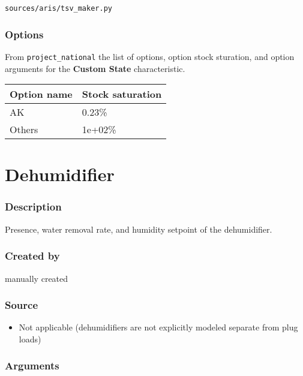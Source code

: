 \texttt{sources/aris/tsv\_maker.py}

\subsubsection{Options}\label{options-30}

From \texttt{project\_national} the list of options, option stock
sturation, and option arguments for the \textbf{Custom State}
characteristic.

\begin{longtable}[]{@{}ll@{}}
\toprule\noalign{}
Option name & Stock saturation \\
\midrule\noalign{}
\endhead
\bottomrule\noalign{}
\endlastfoot
AK & 0.23\% \\
Others & 1e+02\% \\
\end{longtable}

\section{Dehumidifier}\label{dehumidifier}

\subsubsection{Description}\label{description-31}

Presence, water removal rate, and humidity setpoint of the dehumidifier.

\subsubsection{Created by}\label{created-by-31}

manually created

\subsubsection{Source}\label{source-30}

\begin{itemize}
 
\item
  Not applicable (dehumidifiers are not explicitly modeled separate from
  plug loads)
\end{itemize}

\subsubsection{Arguments}\label{arguments-18}

